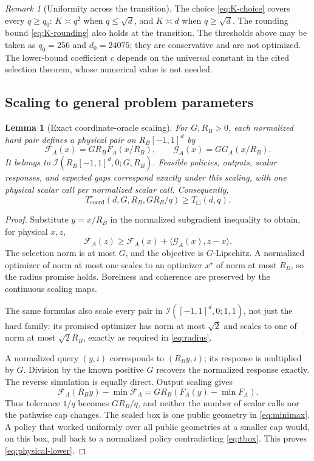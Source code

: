 \documentclass[11pt]{article}
\numberwithin{equation}{section}
\newtheorem{lemma}[lemma]{Lemma}
\theoremstyle{definition}
\theoremstyle{remark}
\newtheorem{remark}[remark]{Remark}
\newcommand{\cI}{\mathcal I}
\newcommand{\Tcoord}{T_{\mathrm{coord}}^\star}
\newcommand{\Tbox}{T_{\Box}}
\newcommand{\ip}[2]{\langle #1,#2\rangle}
\begin{document}
\begin{remark}[Uniformity across the transition]
The choice \eqref{eq:K-choice} covers every $q\ge q_0$: $K\asymp q^2$ when $q\le\sqrt d$, and $K\asymp d$ when $q\ge\sqrt d$. The rounding bound \eqref{eq:K-rounding} also holds at the transition. The thresholds above may be taken as $q_0=256$ and $d_0=24075$; they are conservative and are not optimized. The lower-bound coefficient $c$ depends on the universal constant in the cited selection theorem, whose numerical value is not needed.
\end{remark}

\subsection{Scaling to general problem parameters}

\begin{lemma}[Exact coordinate-oracle scaling]\label{lem:scaling}
For $G,R_B>0$, each normalized hard pair defines a physical pair on $R_B[-1,1]^d$ by
\begin{equation}\label{eq:physical-scaling}
\mathcal F_A(x)=GR_B F_A(x/R_B),\qquad
\mathcal G_A(x)=G G_A(x/R_B).
\end{equation}
It belongs to $\cI(R_B[-1,1]^d,0;G,R_B)$. Feasible policies, outputs, scalar responses, and expected gaps correspond exactly under this scaling, with one physical scalar call per normalized scalar call. Consequently,
\begin{equation}\label{eq:physical-lower}
\Tcoord(d,G,R_B,GR_B/q)\ge\Tbox(d,q).
\end{equation}
\end{lemma}
\begin{proof}
Substitute $y=x/R_B$ in the normalized subgradient inequality to obtain, for physical $x,z$,
\[
\mathcal F_A(z)\ge\mathcal F_A(x)+\ip{\mathcal G_A(x)}{z-x}.
\]
The selection norm is at most $G$, and the objective is $G$-Lipschitz. A normalized optimizer of norm at most one scales to an optimizer $x^\star$ of norm at most $R_B$, so the radius promise holds. Borelness and coherence are preserved by the continuous scaling maps.

The same formulas also scale every pair in $\cI([-1,1]^d,0;1,1)$, not just the hard family: its promised optimizer has norm at most $\sqrt2$ and scales to one of norm at most $\sqrt2R_B$, exactly as required in \eqref{eq:radius}.

A normalized query $(y,i)$ corresponds to $(R_By,i)$; its response is multiplied by $G$. Division by the known positive $G$ recovers the normalized response exactly. The reverse simulation is equally direct. Output scaling gives
\[
\mathcal F_A(R_By)-\min\mathcal F_A
=GR_B(F_A(y)-\min F_A).
\]
Thus tolerance $1/q$ becomes $GR_B/q$, and neither the number of scalar calls nor the pathwise cap changes. The scaled box is one public geometry in \eqref{eq:minimax}. A policy that worked uniformly over all public geometries at a smaller cap would, on this box, pull back to a normalized policy contradicting \eqref{eq:tbox}. This proves \eqref{eq:physical-lower}.
\end{proof}
\end{document}
